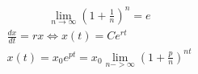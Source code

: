 \documentclass{article}
\begin{document}
    \begin{gather}\label{tak}
        \lim_{n\rightarrow \infty}\left(1+\frac{1}{n}\right)^n=e
    \end{gather}
    \begin{gather}
        \frac{dx}{dt} = rx \iff x(t)=Ce^{rt}\\
        x(t)=x_0e^{pt} = x_0 \lim_{n->\infty} \left( 1+\frac{p}{n} \right)^{n t}
    \end{gather}
    
\end{document}
